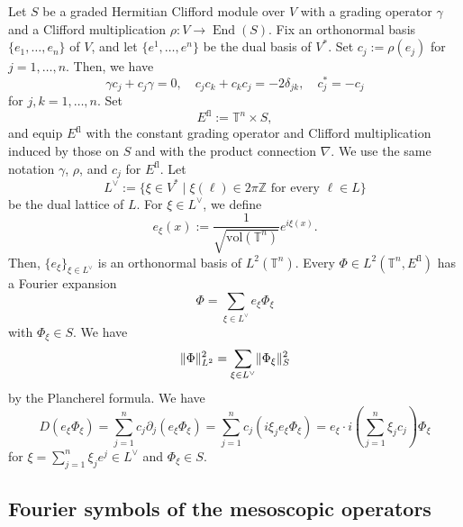 \documentclass[a4paper,oneside,12pt]{amsart}
\theoremstyle{plain}
\theoremstyle{definition}
\theoremstyle{remark}
\newcommand{\Z}{\mathbb{Z}}
\DeclarePairedDelimiter{\norm}{\lVert}{\rVert}
\DeclareMathOperator{\End}{End}
\newcommand{\volume}{\mathrm{vol}}
\newcommand{\flattorus}{\mathbb{T}^n}
\newcommand{\Lattice}{L}
\newcommand{\duallattice}[1]{#1^{\vee}}
\newcommand{\cliffordmultiplication}{\rho}
\newcommand{\Ltwonorm}[2][L^2]{\norm{#2}_{#1}}
\newcommand{\flatmodel}[1]{#1^{\mathrm{fl}}}
\begin{document}
Let $S$ be a graded Hermitian Clifford module over $V$ with a grading operator $\gamma$ and a Clifford multiplication $\cliffordmultiplication \colon V \to \End(S)$.
Fix an orthonormal basis $\{e_1, \dots, e_n\}$ of $V$, and let $\{e^1, \dots, e^n\}$ be the dual basis of $V^*$.
Set $c_j := \cliffordmultiplication(e_j)$ for $j = 1,\dots,n$.
Then, we have
\begin{equation}
  \gamma c_j + c_j \gamma = 0, \quad c_j c_k + c_k c_j = -2 \delta_{jk}, \quad c_j^* = -c_j
\end{equation}
for $j,k = 1,\dots,n$.
Set
\begin{equation}
  \flatmodel{E} := \flattorus \times S,
\end{equation}
and equip $\flatmodel{E}$ with the constant grading operator and Clifford multiplication induced by those on $S$ and with the product connection $\nabla$.
We use the same notation $\gamma$, $\cliffordmultiplication$, and $c_j$ for $\flatmodel{E}$.
Let
\begin{equation}
  \duallattice{\Lattice} := \{ \xi \in V^* \mid \xi(\ell) \in 2\pi\Z \text{ for every } \ell \in \Lattice \}
\end{equation}
be the dual lattice of $\Lattice$.
For $\xi \in \duallattice{\Lattice}$, we define
\begin{equation}
  e_{\xi}(x) := \frac{1}{\sqrt{\volume(\flattorus)}} e^{i\xi(x)}.
\end{equation}
Then, $\{e_{\xi}\}_{\xi \in \duallattice{\Lattice}}$ is an orthonormal basis of $L^2(\flattorus)$.
Every $\Phi \in L^2(\flattorus,\flatmodel{E})$ has a Fourier expansion
\begin{equation}
  \Phi = \sum_{\xi \in \duallattice{\Lattice}} e_{\xi} \Phi_{\xi}
\end{equation}
with $\Phi_{\xi} \in S$.
We have
\begin{equation}
  \Ltwonorm{\Phi}^2 = \sum_{\xi \in \duallattice{\Lattice}} \norm{\Phi_{\xi}}_S^2
\end{equation}
by the Plancherel formula.
We have
\begin{equation}
  D(e_{\xi} \Phi_{\xi}) = \sum_{j=1}^n c_j \partial_j (e_{\xi}\Phi_{\xi}) = \sum_{j=1}^n c_j (i\xi_j e_{\xi} \Phi_{\xi}) = e_{\xi} \cdot i \left(\sum_{j=1}^n \xi_j c_j\right) \Phi_{\xi}
\end{equation}
for $\xi = \sum_{j=1}^n \xi_j e^j \in \duallattice{\Lattice}$ and $\Phi_{\xi} \in S$.

\subsection{Fourier symbols of the mesoscopic operators}
\end{document}
